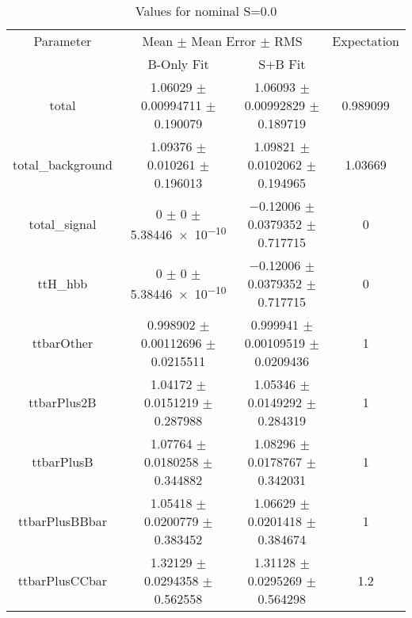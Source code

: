 \begin{table}
\centering
\caption{Values for nominal S=0.0}
\begin{tabular}{cccc}
\toprule
Parameter & \multicolumn{2}{c}{Mean $\pm$ Mean Error $\pm$ RMS} & Expectation\\
 & B-Only Fit & S+B Fit & \\
\midrule
total & \num{1.06029} $\pm$ \num{0.00994711} $\pm$ \num{0.190079} & \num{1.06093} $\pm$ \num{0.00992829} $\pm$ \num{0.189719} & \num{0.989099}\\
total\_background & \num{1.09376} $\pm$ \num{0.010261} $\pm$ \num{0.196013} & \num{1.09821} $\pm$ \num{0.0102062} $\pm$ \num{0.194965} & \num{1.03669}\\
total\_signal & \num{0} $\pm$ \num{0} $\pm$ \num{5.38446e-10} & \num{-0.12006} $\pm$ \num{0.0379352} $\pm$ \num{0.717715} & \num{0}\\
ttH\_hbb & \num{0} $\pm$ \num{0} $\pm$ \num{5.38446e-10} & \num{-0.12006} $\pm$ \num{0.0379352} $\pm$ \num{0.717715} & \num{0}\\
ttbarOther & \num{0.998902} $\pm$ \num{0.00112696} $\pm$ \num{0.0215511} & \num{0.999941} $\pm$ \num{0.00109519} $\pm$ \num{0.0209436} & \num{1}\\
ttbarPlus2B & \num{1.04172} $\pm$ \num{0.0151219} $\pm$ \num{0.287988} & \num{1.05346} $\pm$ \num{0.0149292} $\pm$ \num{0.284319} & \num{1}\\
ttbarPlusB & \num{1.07764} $\pm$ \num{0.0180258} $\pm$ \num{0.344882} & \num{1.08296} $\pm$ \num{0.0178767} $\pm$ \num{0.342031} & \num{1}\\
ttbarPlusBBbar & \num{1.05418} $\pm$ \num{0.0200779} $\pm$ \num{0.383452} & \num{1.06629} $\pm$ \num{0.0201418} $\pm$ \num{0.384674} & \num{1}\\
ttbarPlusCCbar & \num{1.32129} $\pm$ \num{0.0294358} $\pm$ \num{0.562558} & \num{1.31128} $\pm$ \num{0.0295269} $\pm$ \num{0.564298} & \num{1.2}\\
\bottomrule
\end{tabular}
\end{table}